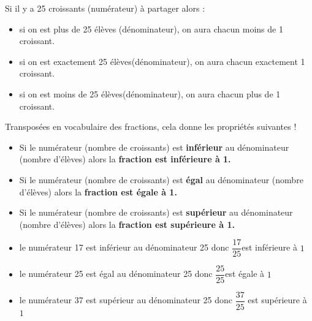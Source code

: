 \begin{remarque}

    Si il y a 25 croissants (numérateur) à partager alors :    
    \begin{itemize}
        \item si on est plus de 25 élèves (dénominateur), on aura chacun moins de 1 croissant.
        \item si on est exactement 25 élèves(dénominateur), on aura chacun exactement 1 croissant.
        \item si on est moins de 25 élèves(dénominateur), on aura chacun plus de 1 croissant.
    \end{itemize}

    \smallskip
    Transposées en vocabulaire des fractions, cela donne les propriétés suivantes ! 
\end{remarque}

{\renewcommand{\StringPROPRIETE}{PROPRI\'ET\'ES}
\begin{propriete}[\admises]
    \begin{itemize}
        \item Si le numérateur (nombre de croissants) est \textbf{inférieur} au dénominateur (nombre d'élèves) alors la \textbf{fraction est inférieure à 1.}
        \item Si le numérateur (nombre de croissants) est \textbf{égal} au dénominateur (nombre d'élèves) alors la \textbf{fraction est égale à 1.}
        \item Si le numérateur (nombre de croissants) est \textbf{supérieur} au dénominateur (nombre d'élèves) alors la \textbf{fraction est supérieure à 1.}
    \end{itemize}
\end{propriete}
}

\begin{exemples*1}
    \begin{itemize}
        \item le numérateur 17 est inférieur au dénominateur 25 donc $\dfrac{17}{25}$est inférieure à $1$
        \item le numérateur 25 est égal au dénominateur 25 donc $\dfrac{25}{25}$est égale à $1$
        \item le numérateur 37 est supérieur au dénominateur 25 donc $\dfrac{37}{25}$ est supérieure à $1$
    \end{itemize}
\end{exemples*1}

